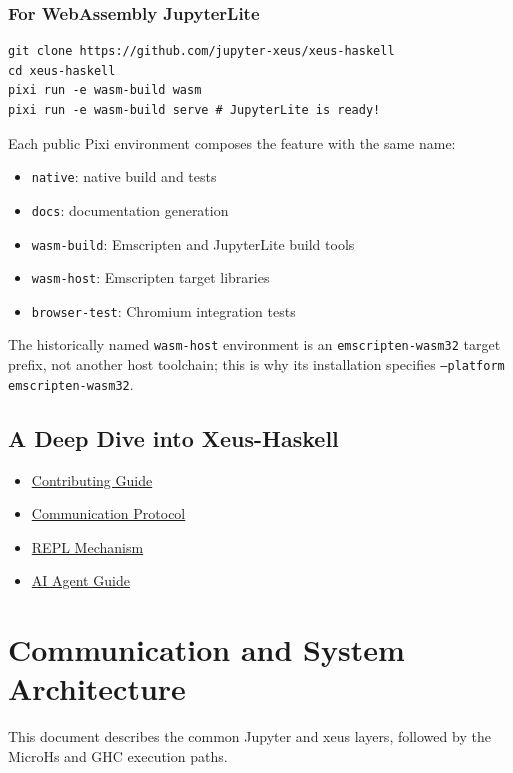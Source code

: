 \documentclass[11pt]{scrartcl}
\begin{document}
\subsubsection{For WebAssembly JupyterLite}


\begin{verbatim}
git clone https://github.com/jupyter-xeus/xeus-haskell
cd xeus-haskell
pixi run -e wasm-build wasm
pixi run -e wasm-build serve # JupyterLite is ready!
\end{verbatim}

Each public Pixi environment composes the feature with the same name:
\begin{itemize}
\item \texttt{native}: native build and tests
\item \texttt{docs}: documentation generation
\item \texttt{wasm-build}: Emscripten and JupyterLite build tools
\item \texttt{wasm-host}: Emscripten target libraries
\item \texttt{browser-test}: Chromium integration tests
\end{itemize}
The historically named \texttt{wasm-host} environment is an
\texttt{emscripten-wasm32} target prefix, not another host toolchain; this is
why its installation specifies \texttt{--platform emscripten-wasm32}.

\subsection{A Deep Dive into Xeus-Haskell}


\begin{itemize}
\item \hyperref[sec:contributing]{Contributing Guide}
\item \hyperref[sec:communication]{Communication Protocol}
\item \hyperref[sec:repl]{REPL Mechanism}
\item \href{https://github.com/jupyter-xeus/xeus-haskell/blob/main/AGENTS.md}{AI Agent Guide}
\end{itemize}

\section{Communication and System Architecture}
\label{sec:communication}


This document describes the common Jupyter and xeus layers, followed by the MicroHs and GHC execution paths.
\end{document}
